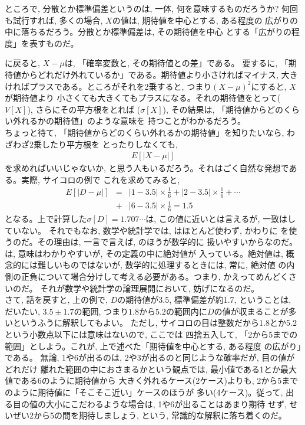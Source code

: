 ところで, 分散とか標準偏差というのは, 一体, 何を意味するものだろうか? 
何回も試行すれば, 多くの場合, $X$の値は, 期待値を中心とする, ある程度の
広がりの中に落ちるだろう。分散とか標準偏差は, その期待値を中心
とする「広がりの程度」を表すものだ。

に戻ると, $X-\mu$は, 「確率変数と, その期待値との差」である。
要するに, 「期待値からどれだけ外れているか」である。期待値より小さければマイナス, 
大きければプラスである。ところがそれを2乗すると, つまり$(X-\mu)^2$にすると, $X$が期待値より
小さくても大きくてもプラスになる。それの期待値をとって($V[X]$), さらにその平方根をとれば
($\sigma[X]$), その結果は, 「期待値からどのくらい外れるかの期待値」のような意味を
持つことがわかるだろう。\\

ちょっと待て, 「期待値からどのくらい外れるかの期待値」を知りたいなら, わざわざ2乗したり平方根を
とったりしなくても, 
\begin{eqnarray}
E[|X-\mu|]\label{eq:probdistance}
\end{eqnarray}
を求めればいいじゃないか, と思う人もいるだろう。それはごく自然な発想である。実際, サイコロの例で
これを求めてみると, 
\begin{eqnarray*}
E[|D-\mu|]&=&|1-3.5|\times\frac{1}{6}+|2-3.5|\times\frac{1}{6}+\cdots\\
&+&|6-3.5|\times\frac{1}{6}=1.5
\end{eqnarray*}
となる。上で計算した$\sigma[D]=1.707\cdots$は, この値に近いとは言えるが, 一致はしていない。
それでもなお, 数学や統計学では, はほとんど使わず, かわりに
を使うのだ。その理由は, 一言で言えば, のほうが数学的に
扱いやすいからなのだ。は, 意味はわかりやすいが, その定義の中に絶対値が
入っている。絶対値は, 概念的には難しいものではないが, 数学的に処理するときには, 常に, 絶対値
の内側の正負について場合分けして考える必要がある。つまり, かえってめんどくさいのだ。
それが数学や統計学の論理展開において, 妨げになるのだ。\\

さて, 話を戻すと, 上の例で, $D$の期待値が3.5, 標準偏差が約1.7, ということは, だいたい, 
$3.5\pm1.7$の範囲, つまり$1.8から5.2$の範囲内に$D$の値が収まることが多いというふうに解釈してもよい。
ただし, サイコロの目は整数だから1.8とか5.2という小数点以下には意味はないので, ここでは
四捨五入して, 「2から5までの範囲」としよう。これが, 上で述べた「期待値を中心とする, ある程度
の広がり」である。
無論, 1や6が出るのは, 2や3が出るのと同じような確率だが, 目の値がどれだけ
離れた範囲の中におさまるかという観点では, 最小値である1とか最大値である6のように期待値から
大きく外れるケース(2ケース)よりも, 2から5までのように期待値に「そこそこ近い」ケースのほうが
多い(4ケース)。従って, 出る目の値の大小にこだわるような場合は, 1や6が出ることはあまり期待
せず, せいぜい2から5の間を期待しましょう, という, 常識的な解釈に落ち着くのだ。\\


